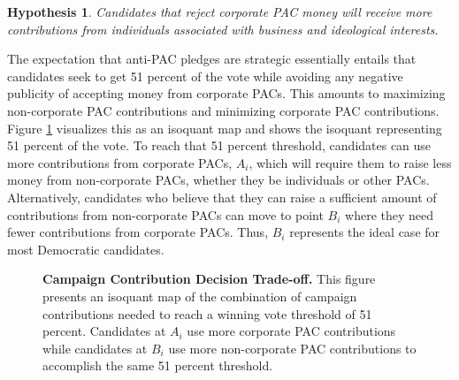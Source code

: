 \documentclass[12pt]{article}
\newtheorem{hyp}{Hypothesis}
\begin{document}
 \begin{hyp}
     Candidates that reject corporate PAC money will receive more contributions from individuals associated with business and ideological interests. 
 \end{hyp}
 
  The expectation that anti-PAC pledges are strategic essentially entails that candidates seek to get 51 percent of the vote while avoiding any negative publicity of accepting money from corporate PACs. This amounts to maximizing non-corporate PAC contributions and minimizing corporate PAC contributions. Figure \ref{fig: iso map} visualizes this as an isoquant map and shows the isoquant representing 51 percent of the vote. To reach that 51 percent threshold, candidates can use more contributions from corporate PACs, $A_i$, which will require them to raise less money from non-corporate PACs, whether they be individuals or other PACs. Alternatively, candidates who believe that they can raise a sufficient amount of contributions from non-corporate PACs can move to point $B_i$ where they need fewer contributions from corporate PACs. Thus, $B_i$ represents the ideal case for most Democratic candidates. 
 
\begin{figure}[!htb]
\centering
{}
\caption{\textbf{Campaign Contribution Decision Trade-off.} This figure presents an isoquant map of the combination of campaign contributions needed to reach a winning vote threshold of 51 percent. Candidates at $A_i$ use more corporate PAC contributions while candidates at $B_i$ use more non-corporate PAC contributions to accomplish the same 51 percent threshold.}
\label{fig: iso map}
\end{figure}
 
\end{document}
